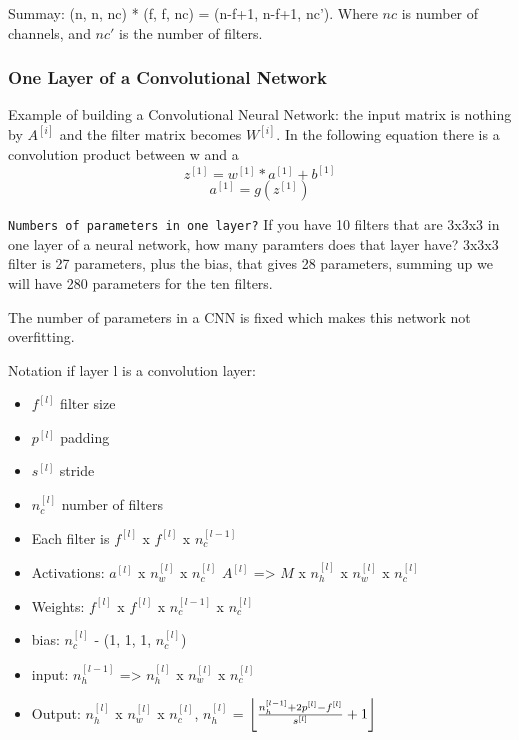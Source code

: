 Summay: (n, n, nc) * (f, f, nc) = (n-f+1, n-f+1, nc'). Where $nc$ is number of channels, and $nc'$ is the number of filters.

\subsubsection{One Layer of a Convolutional Network}
Example of building a Convolutional Neural Network: the input matrix is nothing by $A^{[i]}$ and the filter matrix becomes $W^{[i]}$. In the following equation there is a convolution product between w and a
\begin{equation}
    z^{[1]} = w^{[1]} * a^{[1]} + b^{[1]}
\end{equation}
\begin{equation}
    a^{[1]} = g(z^{[1]})
\end{equation}

\texttt{Numbers of parameters in one layer?}
If you have 10 filters that are 3x3x3 in one layer of a neural network, how many paramters does that layer have?
3x3x3 filter is 27 parameters, plus the bias, that gives 28 parameters, summing up we will have 280 parameters for the ten filters.

The number of parameters in a CNN is fixed which makes this network not overfitting.


Notation
if layer l is a convolution layer:
\begin{itemize}
    \item $f^{[l]}$ filter size
    \item $p^{[l]}$ padding
    \item $s^{[l]}$ stride
    \item $n^{[l]}_c$ number of filters
    \item Each filter is $f^{[l]}$ x $f^{[l]}$ x $n^{[l-1]}_c$
    \item Activations: $a^{[l]}$ x $n^{[l]}_w$ x $n^{[l]}_c$
$A^{[l]}$ => $M$ x $n^{[l]}_h$ x $n^{[l]}_w$ x $n^{[l]}_c$
    \item Weights: $f^{[l]}$ x $f^{[l]}$ x $n^{[l-1]}_c$ x $n^{[l]}_c$
    \item bias: $n^{[l]}_c$ - (1, 1, 1, $n^{[l]}_c$)

    \item input: $n^{[l-1]}_h$ => $n^{[l]}_h$ x $n^{[l]}_w$ x $n^{[l]}_c$
    \item Output: $n^{[l]}_h$ x $n^{[l]}_w$ x $n^{[l]}_c$, 
$n^{[l]}_h$ = $\floor*{\frac{n^{[l-1]}_h + 2 p^{[l]} - f^{[l]}} {s^{[l]}} + 1}$
\end{itemize}

